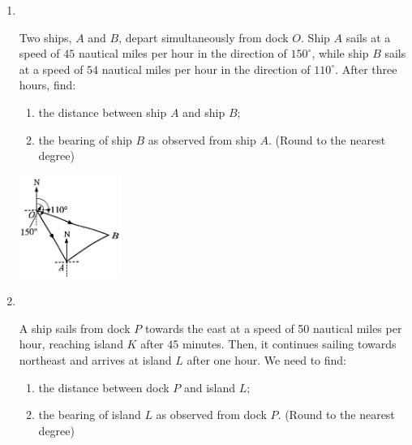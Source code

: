 \documentclass{report}
\begin{document}
\begin{enumerate}
        \newpage    
        \item \parbox[t]{0.9\textwidth}{
            ~
            \vspace{-1.1em}
            \begin{vwcol}[widths={0.6,0.4}, sep=8mm, rule=0pt]
                Two ships, $A$ and $B$, depart simultaneously from dock $O$. Ship $A$ sails at a speed of $45$ nautical miles per hour in the direction of $150^\circ$, while ship $B$ sails at a speed of $54$ nautical miles per hour in the direction of $110^\circ$. After three hours, find:
                
                \noindent\parbox[t]{0.5\textwidth}{
                    \begin{enumerate}
                        \item the distance between ship $A$ and ship $B$;
                        \item the bearing of ship $B$ as observed from ship $A$. (Round to the nearest degree)
                    \end{enumerate}
                }
    
                \includegraphics[width=0.26\textwidth]{assets/10-73.jpg}
            \end{vwcol}
        }

        \vspace{-3em}
        \item \parbox[t]{0.9\textwidth}{
            ~
            \vspace{-1.1em}
            \begin{vwcol}[widths={0.6,0.4}, sep=8mm, rule=0pt]
                A ship sails from dock $P$ towards the east at a speed of 50 nautical miles per hour, reaching island $K$ after $45$ minutes. Then, it continues sailing towards northeast and arrives at island $L$ after one hour. We need to find:
        
                \noindent\parbox[t]{0.5\textwidth}{
                    \begin{enumerate}
                        \item the distance between dock $P$ and island $L$;
                        \item the bearing of island $L$ as observed from dock $P$. (Round to the nearest degree)
                    \end{enumerate}
                }
    

\end{vwcol}}
\end{enumerate}
\end{document}
